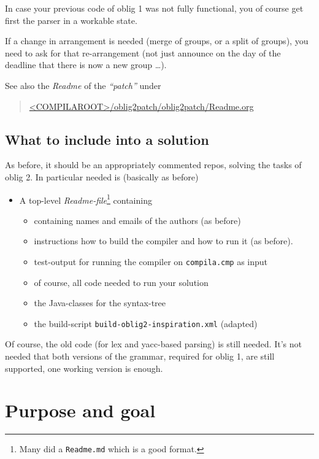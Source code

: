 \documentclass[11pt,freeform]{handout}[2014/08/13]
\begin{document}
In case your previous code of oblig 1 was not fully functional, you of
course get first the parser in a workable state.


If a change in arrangement is needed (merge of groups, or a split of
groups), you need to ask for that re-arrangement (not just announce on the
day of the deadline that there is now a new group \ldots).



See also the \emph{Readme} of the \emph{``patch''} under

\begin{quote}
  \url{<COMPILAROOT>/oblig2patch/oblig2patch/Readme.org}
\end{quote}


\subsection{What to include into a solution}
\label{sec:what-include-into}

As before, it should be an appropriately commented repos, solving the tasks
of oblig 2. In particular needed is (basically as before)


\begin{itemize}
\item A top-level \emph{Readme-file}\footnote{Many did a \texttt{Readme.md}
    which is a good format.} containing
  \begin{itemize}
  \item containing names and emails of the authors (as before)
  \item instructions how to build the compiler and how to run it (as
    before).
  \item test-output for running the compiler on \texttt{compila.cmp} as
    input
  \item of course, all code needed to run your solution 
  \item the Java-classes for the syntax-tree
  \item the build-script \texttt{build-oblig2-inspiration.xml} (adapted)
  \end{itemize}
\end{itemize}

Of course, the old code (for lex and yacc-based parsing) is still
needed. It's not needed that both versions of the grammar, required for
oblig 1, are still supported, one working version is enough.



\section{Purpose and goal}
\label{sec:x}
\end{document}
